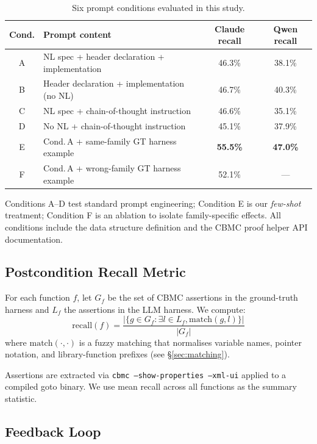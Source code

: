 \documentclass[review]{elsarticle}
\begin{document}
\begin{table}[h]
\centering
\caption{Six prompt conditions evaluated in this study.}
\label{tab:conditions}
\begin{tabular}{clcc}
\toprule
\textbf{Cond.} & \textbf{Prompt content} & \textbf{Claude recall} & \textbf{Qwen recall} \\
\midrule
A & NL spec + header declaration + implementation & 46.3\% & 38.1\% \\
B & Header declaration + implementation (no NL) & 46.7\% & 40.3\% \\
C & NL spec + chain-of-thought instruction & 46.6\% & 35.1\% \\
D & No NL + chain-of-thought instruction & 45.1\% & 37.9\% \\
E & Cond.\,A + same-family GT harness example & \textbf{55.5\%} & \textbf{47.0\%} \\
F & Cond.\,A + wrong-family GT harness example & 52.1\% & --- \\
\bottomrule
\end{tabular}
\end{table}

\noindent Conditions A--D test standard prompt engineering; Condition E is our
\emph{few-shot} treatment; Condition F is an ablation to isolate family-specific
effects. All conditions include the data structure definition and the CBMC proof
helper API documentation.

\subsection{Postcondition Recall Metric}

For each function $f$, let $G_f$ be the set of CBMC assertions in the ground-truth
harness and $L_f$ the assertions in the LLM harness. We compute:
\[
  \text{recall}(f) = \frac{|\{g \in G_f : \exists l \in L_f, \text{match}(g, l)\}|}{|G_f|}
\]
where $\text{match}(\cdot, \cdot)$ is a fuzzy matching that normalises variable names,
pointer notation, and library-function prefixes (see \S\ref{sec:matching}).

Assertions are extracted via \texttt{cbmc --show-properties --xml-ui} applied to a
compiled goto binary. We use mean recall across all functions as the summary statistic.

\subsection{Feedback Loop}
\end{document}
